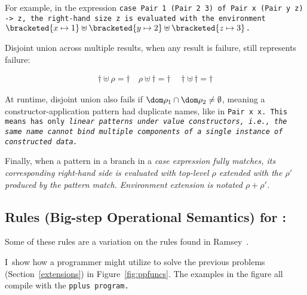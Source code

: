 \documentclass[manuscript,screen,review, 12pt, nonacm]{acmart}
\begin{document}
For example, in the \PPlus expression \tt{case Pair 1 (Pair 2 3) of Pair x (Pair
y z) -> z}, the right-hand size \tt{z} is evaluated with the environment
$\bracketed{x \mapsto 1} \uplus \bracketed{y \mapsto 2} \uplus \bracketed{z
\mapsto 3}$. 

Disjoint union across multiple results, when any result is failure, still
represents failure: 

\begin{gather*}
  \dagger \uplus \rho = \dagger \quad
  \rho \uplus \dagger = \dagger \quad
  \dagger \uplus\, \dagger = \dagger
\end{gather*}


At runtime, disjoint union also fails if  $\dom \rho_{1} \cap \dom \rho_{2} \neq
\emptyset$, meaning a constructor-application pattern had duplicate names, like
in \tt{Pair x x}. This means \PPlus has only \it{linear} patterns under value
constructors, i.e., the same name cannot bind multiple components of a single
instance of constructed data. 

Finally, when a pattern in a branch in a \it{case} expression fully matches, its
corresponding right-hand side is evaluated with top-level $\rho$ extended with
the $\rho'$ produced by the pattern match. Environment extension is notated
$\rho + \rho'$. 

    \subsection{Rules (Big-step Operational Semantics) for \PPlus:}
    \label{ppsemantics}
    
    Some of these rules are a variation on the rules found in Ramsey~\cite{bpc}.   
    
      \ppsemantics 
      
      \bigskip 
    
    I~show how a programmer might utilize \PPlus to solve the previous problems
    (Section~\ref{extensions}) in Figure~\ref{fig:ppfuncs}. The examples in the
    figure all compile with the \tt{pplus} program. 
\end{document}
